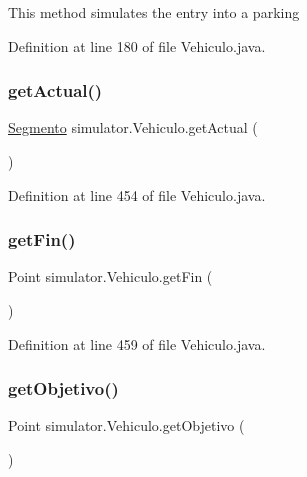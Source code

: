 This method simulates the entry into a parking 

Definition at line 180 of file Vehiculo.\+java.

\mbox{\label{classsimulator_1_1_vehiculo_ad6305ffaaa4eee022c07cac7515df015}} 
\subsubsection{\texorpdfstring{get\+Actual()}{getActual()}}
{\footnotesize\ttfamily \mbox{\hyperlink{classsimulator_1_1_segmento}{Segmento}} simulator.\+Vehiculo.\+get\+Actual (\begin{DoxyParamCaption}{ }\end{DoxyParamCaption})}



Definition at line 454 of file Vehiculo.\+java.

\mbox{\label{classsimulator_1_1_vehiculo_a4adff38665fbd605cc1aadf42dae9787}} 
\subsubsection{\texorpdfstring{get\+Fin()}{getFin()}}
{\footnotesize\ttfamily Point simulator.\+Vehiculo.\+get\+Fin (\begin{DoxyParamCaption}{ }\end{DoxyParamCaption})}



Definition at line 459 of file Vehiculo.\+java.

\mbox{\label{classsimulator_1_1_vehiculo_a12c1abc60bddb033fdd3e04f14bb8314}} 
\subsubsection{\texorpdfstring{get\+Objetivo()}{getObjetivo()}}
{\footnotesize\ttfamily Point simulator.\+Vehiculo.\+get\+Objetivo (\begin{DoxyParamCaption}{ }\end{DoxyParamCaption})}



